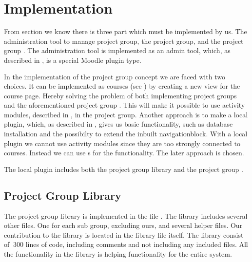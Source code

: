 \chapter{Implementation}
\label{chap:implementation}
From section  we know there is three part which must be implemented by us. 
The administration tool to manage project group, the project group, and the project group \viewroom. 
The administration tool is implemented as an admin tool, which, as described in , is a special Moodle plugin type. 

In the implementation of the project group concept we are faced with two choices. 
It can be implemented as courses (see ) by creating a new view for the course page. 
Hereby solving the problem of both implementing project groups and the aforementioned project group \viewroom.
This will make it possible to use activity modules, described in , in the project group. 
Another approach is to make a local plugin, which, as described in , gives us basic functionality, such as database installation and the possibilty to extend the inbuilt navigationblock. 
With a local plugin we cannot use activity modules since they are too strongly connected to courses. 
Instead we can use \block{}s for the functionality. 
The later approach is chosen. 

The local plugin includes both the project group library and the project group  \viewroom. 


\section{Project Group Library}
\label{sec:pglib}
The project group library is implemented in the file . 
The library includes several other files.%
One for each sub group, excluding ours, and several helper files. 
Our contribution to the library is located in the library file itself. 
The library consist of $~300$ lines of code, including comments and not including any included files. 
All the functionality in the library is helping functionality for the entire system. 

